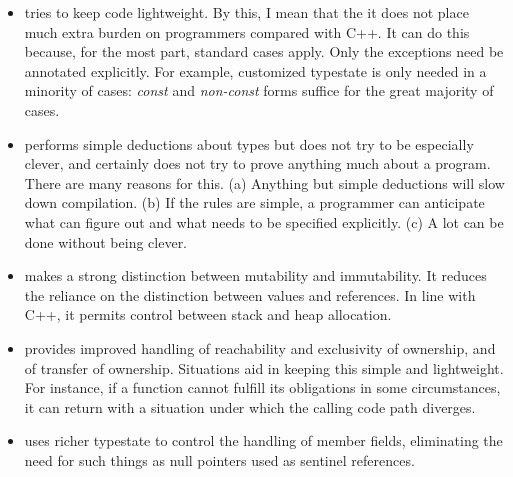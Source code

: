 \documentclass[10pt]{amsart}
\begin{document}
\begin{itemize}
\item \Utop tries to keep code lightweight.  By this, I mean that the
  it does not place much extra burden on programmers compared with
  C++\@.  It can do this because, for the most part, standard cases
  apply.  Only the exceptions need be annotated explicitly.  For
  example, customized typestate is only needed in a minority of cases:
  \emph{const} and \emph{non-const} forms suffice for the great
  majority of cases.
\item \Utop performs simple deductions about types but does not try to
  be especially clever, and certainly does not try to prove anything
  much about a program.  There are many reasons for this.  (a)
  Anything but simple deductions will slow down compilation.  (b) If
  the rules are simple, a programmer can anticipate what \Utop can
  figure out and what needs to be specified explicitly.  (c) A lot can
  be done without being clever.
\item \Utop makes a strong distinction between mutability and
  immutability.  It reduces the reliance on the distinction between
  values and references.  In line with C++, it permits control between
  stack and heap allocation.
\item \Utop provides improved handling of reachability and exclusivity
  of ownership, and of transfer of ownership.  Situations aid in
  keeping this simple and lightweight.  For instance, if a function
  cannot fulfill its obligations in some circumstances, it can return
  with a situation under which the calling code path diverges.
\item \Utop uses richer typestate to control the handling of member
  fields, eliminating the need for such things as null pointers used
  as sentinel references.
\end{itemize}



\end{document}
